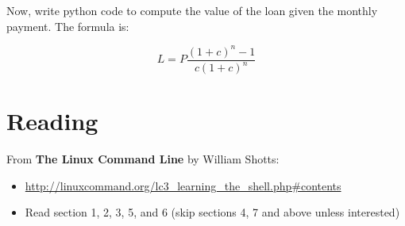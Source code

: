 \documentclass[12pt,letterpaper,twoside]{article}
\begin{document}
Now, write python code to compute the value of the loan given the
monthly payment. The formula is:

\[
L = P \frac{(1+c)^n-1}{c(1+c)^n}
\]

\section{Reading}
From \textbf{The Linux Command Line} by William Shotts: 

\begin{itemize}
\item \url{http://linuxcommand.org/lc3_learning_the_shell.php\#contents}
\item Read section 1, 2, 3, 5, and 6 (skip sections 4, 7 and above unless
interested)
\end{itemize}







\end{document}
